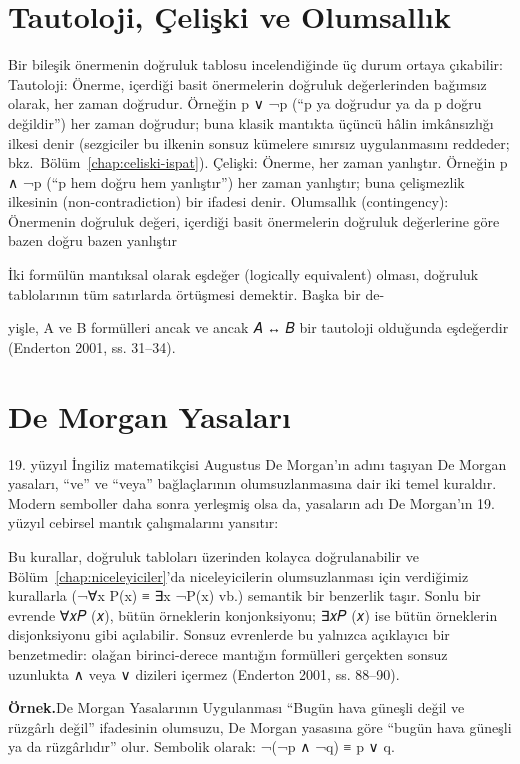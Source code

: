 \section{Tautoloji, Çelişki ve Olumsallık}

Bir bileşik önermenin doğruluk tablosu incelendiğinde üç durum ortaya çıkabilir: Tautoloji: Önerme, içerdiği basit önermelerin doğruluk değerlerinden bağımsız olarak, her zaman doğrudur. Örneğin p ∨ ¬p (“p ya doğrudur ya da p doğru değildir”) her zaman doğrudur; buna klasik mantıkta üçüncü hâlin imkânsızlığı ilkesi denir (sezgiciler bu ilkenin sonsuz kümelere sınırsız uygulanmasını reddeder; bkz.\ Bölüm~\ref{chap:celiski-ispat}). Çelişki: Önerme, her zaman yanlıştır. Örneğin p ∧ ¬p (“p hem doğru hem yanlıştır”) her zaman yanlıştır; buna çelişmezlik ilkesinin (non-contradiction) bir ifadesi denir. Olumsallık (contingency): Önermenin doğruluk değeri, içerdiği basit önermelerin doğruluk değerlerine göre bazen doğru bazen yanlıştır

İki formülün mantıksal olarak eşdeğer (logically equivalent) olması, doğruluk tablolarının tüm satırlarda örtüşmesi demektir. Başka bir de-

yişle, A ve B formülleri ancak ve ancak 𝐴 ↔ 𝐵 bir tautoloji olduğunda eşdeğerdir (Enderton 2001, ss. 31–34).

\section{De Morgan Yasaları}

19. yüzyıl İngiliz matematikçisi Augustus De Morgan’ın adını taşıyan De Morgan yasaları, “ve” ve “veya” bağlaçlarının olumsuzlanmasına dair iki temel kuraldır. Modern semboller daha sonra yerleşmiş olsa da, yasaların adı De Morgan’ın 19. yüzyıl cebirsel mantık çalışmalarını yansıtır:

Bu kurallar, doğruluk tabloları üzerinden kolayca doğrulanabilir ve Bölüm~\ref{chap:niceleyiciler}’da niceleyicilerin olumsuzlanması için verdiğimiz kurallarla (¬∀x P(x) ≡ ∃x ¬P(x) vb.) semantik bir benzerlik taşır. Sonlu bir evrende ∀𝑥𝑃 (𝑥), bütün örneklerin konjonksiyonu; ∃𝑥𝑃 (𝑥) ise bütün örneklerin disjonksiyonu gibi açılabilir. Sonsuz evrenlerde bu yalnızca açıklayıcı bir benzetmedir: olağan birinci-derece mantığın formülleri gerçekten sonsuz uzunlukta ∧ veya ∨ dizileri içermez (Enderton 2001, ss. 88–90).

\begin{tcolorbox}[bookbox,colback=cEx]\textbf{\textsf{\textcolor{cAcc}{Örnek.}}}\quad De Morgan Yasalarının Uygulanması “Bugün hava güneşli değil ve rüzgârlı değil” ifadesinin olumsuzu, De Morgan yasasına göre “bugün hava güneşli ya da rüzgârlıdır” olur. Sembolik olarak: ¬(¬p ∧ ¬q) ≡ p ∨ q.\end{tcolorbox}

